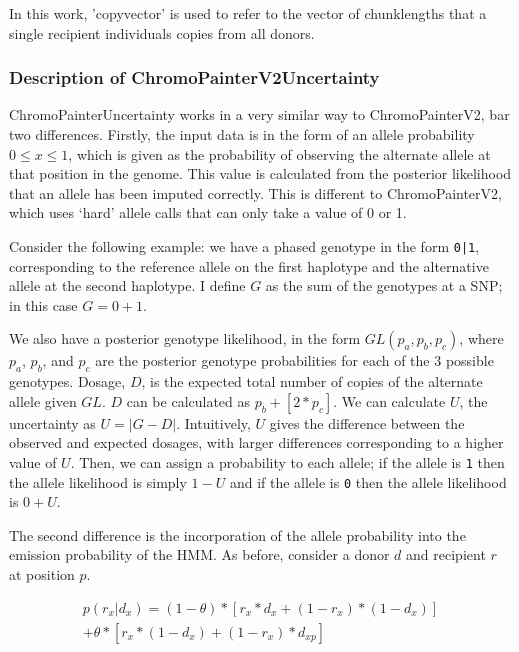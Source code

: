 In this work, 'copyvector' is used to refer to the vector of chunklengths that a single recipient individuals copies from all donors.

\subsubsection{Description of ChromoPainterV2Uncertainty}

ChromoPainterUncertainty works in a very similar way to ChromoPainterV2, bar two differences. Firstly, the input data is in the form of an allele probability $0 \leq x \leq 1$, which is given as the probability of observing the alternate allele at that position in the genome. This value is calculated from the posterior likelihood that an allele has been imputed correctly. This is different to ChromoPainterV2, which uses `hard' allele calls that can only take a value of 0 or 1.

Consider the following example: we have a phased genotype in the form \texttt{0|1}, corresponding to the reference allele on the first haplotype and the alternative allele at the second haplotype. I define $G$ as the sum of the genotypes at a SNP; in this case $G=0+1$.

We also have a posterior genotype likelihood, in the form $GL(p_{a}, p_{b}, p_{c})$, where $p_{a}$, $p_{b}$, and $p_{c}$ are the posterior genotype probabilities for each of the 3 possible genotypes. Dosage, $D$, is the expected total number of copies of the alternate allele given $GL$. $D$ can be calculated as $p_{b} + [2*p_{c}]$. We can calculate $U$, the uncertainty as $U = |G-D|$. Intuitively, $U$ gives the difference between the observed and expected dosages, with larger differences corresponding to a higher value of $U$. Then, we can assign a probability to each allele; if the allele is \texttt{1} then the allele likelihood is simply $1 - U$ and if the allele is \texttt{0} then the allele likelihood is $0 + U$.
                 
The second difference is the incorporation of the allele probability into the emission probability of the HMM. As before, consider a donor $d$ and recipient $r$ at position $p$.

\begin{equation}
\begin{split}
p(r_{x} | d_{x}) = (1-\theta)*[r_{x}*d_{x} + (1-r_{x}) * (1-d_{x})] \\ + \theta * [r_{x}*(1-d_{x}) + (1-r_{x})*d_{xp}]
\end{split}
\end{equation}

